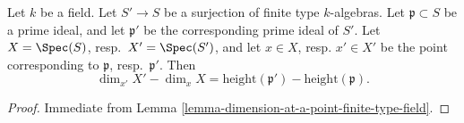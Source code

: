 \begin{lemma}
\label{lemma-codimension}
Let $k$ be a field.
Let $S' \to S$ be a surjection of finite type $k$-algebras.
Let $\mathfrak p \subset S$ be a prime ideal,
and let $\mathfrak p'$ be the corresponding prime ideal of $S'$.
Let $X = \Spec(S)$, resp.\ $X' = \Spec(S')$,
and let $x \in X$, resp. $x'\in X'$ be the point corresponding
to $\mathfrak p$, resp.\ $\mathfrak p'$.
Then
$$
\dim_{x'} X' - \dim_x X =
\text{height}(\mathfrak p') - \text{height}(\mathfrak p).
$$
\end{lemma}

\begin{proof}
Immediate from Lemma \ref{lemma-dimension-at-a-point-finite-type-field}.
\end{proof}
